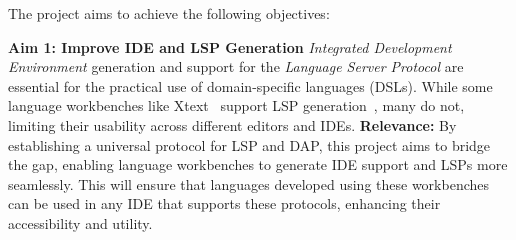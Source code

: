 \begin{table}[t]
    \centering
    \caption*{Comparison of language workbenches in terms of modularization, precompiled feature support, native IDE generation, LSP generation, and LSP modularization.}
    \label{tab:lw-comparison}
\end{table}

\hfill \break
The project aims to achieve the following objectives:

\hfill \break
\noindent
\textbf{Aim 1: Improve IDE and LSP Generation}
\hfill \break
\textit{Integrated Development Environment} generation and support for the \textit{Language Server Protocol} are essential for the practical use of domain-specific languages (DSLs). While some language workbenches like Xtext~\cite{Bettini13b} support LSP generation~\cite{Barros22}, many do not, limiting their usability across different editors and IDEs.
\hfill \break
\textbf{Relevance:} By establishing a universal protocol for LSP and DAP, this project aims to bridge the gap, enabling language workbenches to generate IDE support and LSPs more seamlessly. This will ensure that languages developed using these workbenches can be used in any IDE that supports these protocols, enhancing their accessibility and utility.

